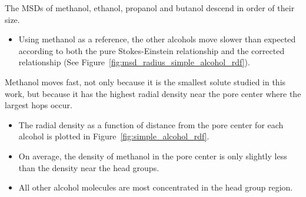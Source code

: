 \documentclass{article}
\begin{document}

  The MSDs of methanol, ethanol, propanol and butanol descend in order of 
  their size.
  \begin{itemize}
    \item Using methanol as a reference, the other alcohols move slower than
    expected according to both the pure Stokes-Einstein relationship and the
    corrected relationship (See Figure~\ref{fig:msd_radius_simple_alcohol_rdf}).
  \end{itemize}   
  
  Methanol moves fast, not only because it is the smallest solute studied in this work, but
  because it has the highest radial density near the pore center where the largest hops occur.
  \begin{itemize}
    \item The radial density as a function of distance from the pore center
    for each alcohol is plotted in Figure~\ref{fig:simple_alcohol_rdf}.
    \item On average, the density of methanol in the pore center is only slightly
    less than the density near the head groups.
    \item All other alcohol molecules are most concentrated in the head group region.
  \end{itemize}
  
\end{document}
